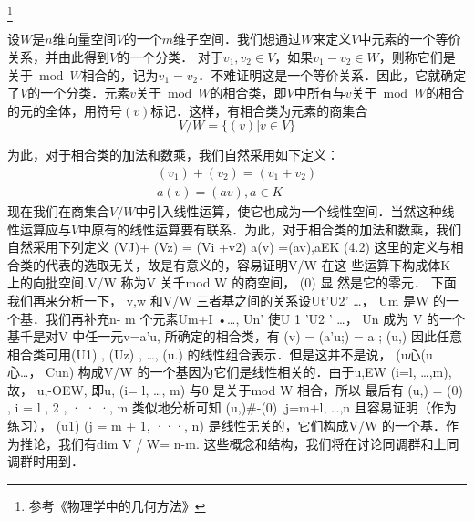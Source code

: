 

\footnote{参考《物理学中的几何方法》}

设$W$是$n$维向量空间$V$的一个$m$维子空间．我们想通过$W$来定义$V$中元素的一个等价关系，并由此得到$V$的一个分类．
对于$v_1,v_2\in V$，如果$v_1-v_2\in W$，则称它们是关于$\bmod W $相合的，记为$v_1=v_2$．不难证明这是一个等价关系．因此，它就确定了$V $的一个分类．元素$v $关于$\bmod W $的相合类，即$V $中所有与$v $关于$\bmod W $的相合的元的全体，用符号$(v) $标记．这样，有相合类为元素的商集合
\begin{equation}
V / W=\{(v) | v \in V\}
\end{equation}

为此，对于相合类的加法和数乘，我们自然采用如下定义：
\begin{equation}
\begin{array}{l}\left(v_{1}\right)+\left(v_{2}\right)=\left(v_{1}+v_{2}\right) \\ a(v)=(a v), a \in K\end{array}
\end{equation}
现在我们在商集合$V/W $中引入线性运算，使它也成为一个线性空间．当然这种线性运算应与$V $中原有的线性运算要有联系．为此，对于相合类的加法和数乘，我们自然采用下列定义
(VJ)+ (Vz) = (Vi +v2)
a(v) =(av),aEK
(4.2)
这里的定义与相合类的代表的选取无关，故是有意义的，容易证明V/W 在这
些运算下构成体K 上的向批空间.V/W 称为V 关千mod W 的商空间， (0) 显
然是它的零元．
下面我们再来分析一下， v,w 和V/W 三者基之间的关系设Ut'U2' …，
Um 是W 的一个基．我们再补充n- m 个元素Um+I •…, Un' 使U 1 'U2 ' …， Un 成为
V 的一个基千是对V 中任一元v=a'u, 所确定的相合类，有
(v) = (a'u;) = a ; (u,)
因此任意相合类可用(U1) , (Uz) , …, (u.) 的线性组合表示．但是这并不是说，
(u心(u心…， Cun) 构成V/W 的一个基因为它们是线性相关的．由于u,EW
(i=l, …,m), 故， u,-OEW, 即u, (i= l, …, m) 与0 是关于mod W 相合，所以
最后有
(u,) = (0) , i = l , 2 , · · ·, m
类似地分析可知
(u,)#-(0) ,j=m+l, …,n
且容易证明（作为练习）， (u1) (j = m + 1, ···, n) 是线性无关的，它们构成V/W
的一个基．作为推论，我们有dim V / W= n-m.
这些概念和结构，我们将在讨论同调群和上同调群时用到．